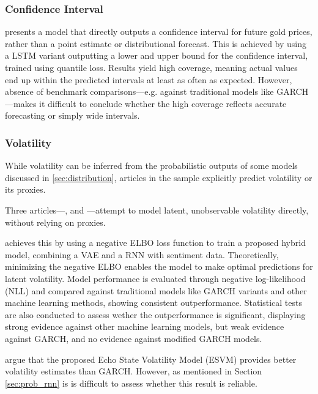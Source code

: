 \subsubsection{Confidence Interval}

\textcite{Wang2024GoldForecasting} presents a model that directly outputs a confidence interval for future gold prices, rather than a point estimate or distributional forecast. This is achieved by using a LSTM variant outputting a lower and upper bound for the confidence interval, trained using quantile loss. Results yield high coverage, meaning actual values end up within the predicted intervals at least as often as expected. However, absence of benchmark comparisons—e.g. against traditional models like GARCH—makes it difficult to conclude whether the high coverage reflects accurate forecasting or simply wide intervals.



\subsubsection{Volatility}

While volatility can be inferred from the probabilistic outputs of some models discussed in \ref{sec:distribution}, \volatilityoutput articles in the sample explicitly predict volatility or its proxies.

Three articles—\textcite{xing2019sentiment}, \textcite{Parker2021BayesianHeteroskedastic} and \textcite{Platanios2014gpr}—attempt to model latent, unobservable volatility directly, without relying on proxies. 

\textcite{xing2019sentiment} achieves this by using a negative ELBO loss function to train a proposed hybrid model, combining a VAE and a RNN with sentiment data. Theoretically, minimizing the negative ELBO enables the model to make optimal predictions for latent volatility. Model performance is evaluated through negative log-likelihood (NLL) and compared against traditional models like GARCH variants and other machine learning methods, showing consistent outperformance. Statistical tests are also conducted to assess wether the outperformance is significant, displaying strong evidence against other machine learning models, but weak evidence against GARCH, and no evidence against modified GARCH models.

\textcite{Parker2021BayesianHeteroskedastic} argue that the proposed Echo State Volatility Model (ESVM) provides better volatility estimates than GARCH. However, as mentioned in Section \ref{sec:prob_rnn} is is difficult to assess whether this result is reliable.

